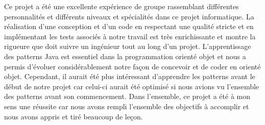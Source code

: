 Ce projet a été une excellente expérience de groupe rassemblant différentes personnalités et différents niveaux et spécialités dans ce projet informatique. 
La réalisation d'une conception et d'un code en respectant une qualité stricte et en implémentant les tests associés à notre travail est très enrichissante et montre la rigueure que doit suivre un ingénieur tout au long d'un projet.
L'apprentissage des patterns Java est essentiel dans la programmation orienté objet et nous a permis d'évoluer considérablement notre façon de concevoir et de coder en orienté objet.
Cependant, il aurait été plus intéressant d'apprendre les patterns avant le début de notre projet car celui-ci aurait été optimisé si nous avions vu l'ensemble des patterns avant son commencement. 
Dans l'ensemble, ce projet a été à mon sens une réussite car nous avons rempli l'ensemble des objectifs à accomplir et nous avons appris et tiré beaucoup de leçon.